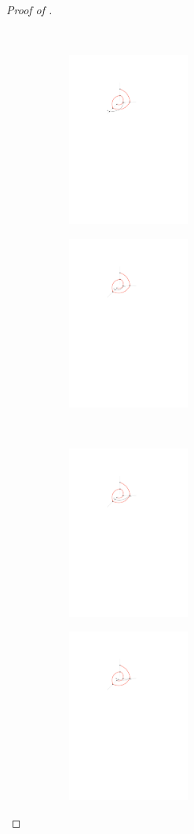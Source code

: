 \documentclass{patmorin}
\begin{document}
\begin{proof}[Proof of ]
\begin{figure}
\begin{center}
    \\[2ex]
    \begin{subfigure}[t]{0.4\hsize}\includegraphics[width=40mm]{figs/2layermaximum-4} \caption{}\end{subfigure}
    \begin{subfigure}[t]{0.4\hsize}\includegraphics[width=40mm]{figs/2layermaximum-5} \caption{}\end{subfigure}
    \\[2ex]
    \begin{subfigure}[t]{0.4\hsize}\includegraphics[width=40mm]{figs/2layermaximum-6} \caption{}\end{subfigure}
    \begin{subfigure}[t]{0.4\hsize}\includegraphics[width=40mm]{figs/2layermaximum-7} \caption{}\end{subfigure}

\end{center}
\end{figure}
\end{proof}
\end{document}
